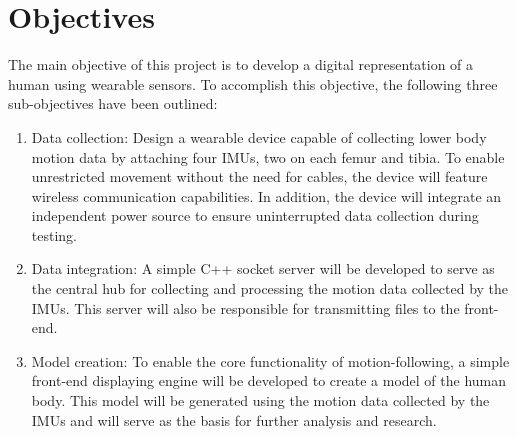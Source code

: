 

\section{Objectives}
    The main objective of this project is to develop a digital representation of a human using wearable sensors.
    To accomplish this objective, the following three sub-objectives have been outlined:
\begin{enumerate}\label{obj}
    \item \label{itm:obj-data-collection}Data collection:
    Design a wearable device capable of collecting lower body motion data by attaching four IMUs, two on each femur and tibia.
    To enable unrestricted movement without the need for cables, the device will feature wireless communication capabilities.
    In addition, the device will integrate an independent power source to ensure uninterrupted data collection during testing.

    \item \label{itm:obj-data-integration}Data integration:
    A simple C++ socket server will be developed to serve as the central hub for collecting and processing the motion data collected by the IMUs.
    This server will also be responsible for transmitting files to the front-end.

    \item \label{itm:obj-model-creation} Model creation:
    To enable the core functionality of motion-following, a simple front-end displaying engine will be developed to create a model of the human body.
    This model will be generated using the motion data collected by the IMUs and will serve as the basis for further analysis and research.
\end{enumerate}


